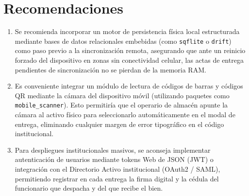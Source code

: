 \documentclass[12pt,a4paper]{article}
\begin{document}
\section{Recomendaciones}
\begin{enumerate}
    \item Se recomienda incorporar un motor de persistencia física local estructurada mediante bases de datos relacionales embebidas (como \texttt{sqflite} o \texttt{drift}) como paso previo a la sincronización remota, asegurando que ante un reinicio forzado del dispositivo en zonas sin conectividad celular, las actas de entrega pendientes de sincronización no se pierdan de la memoria RAM.
    \item Es conveniente integrar un módulo de lectura de códigos de barras y códigos QR mediante la cámara del dispositivo móvil (utilizando paquetes como \texttt{mobile\_scanner}). Esto permitiría que el operario de almacén apunte la cámara al activo físico para seleccionarlo automáticamente en el modal de entrega, eliminando cualquier margen de error tipográfico en el código institucional.
    \item Para despliegues institucionales masivos, se aconseja implementar autenticación de usuarios mediante tokens Web de JSON (JWT) o integración con el Directorio Activo institucional (OAuth2 / SAML), permitiendo registrar en cada entrega la firma digital y la cédula del funcionario que despacha y del que recibe el bien.
\end{enumerate}

\end{document}
